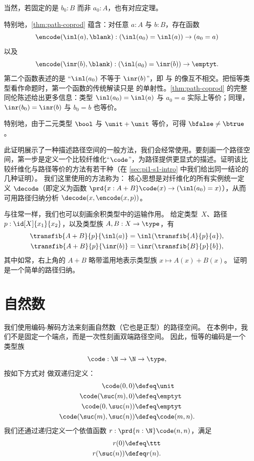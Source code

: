 \noindent
当然，若固定的是 $b_0:B$ 而非 $a_0:A$，也有对应定理。

特别地，\cref{thm:path-coprod} 蕴含：对任意 $a : A$ 与 $b : B$，存在函数
%
\[ \encode(\inl(a), {\blank}) : (\inl(a_0)=\inl(a)) \to (a_0=a)\]
%
以及
%
\[ \encode(\inr(b), {\blank}) : (\inl(a_0)=\inr(b)) \to \emptyt. \]
%
第二个函数表述的是
“$\inl(a_0)$ 不等于 $\inr(b)$”，即 \inl 与 \inr 的像互不相交。把恒等类型看作命题时，第一个函数的传统解读只是 \inl 的单射性。\cref{thm:path-coprod} 的完整同伦陈述给出更多信息：类型 $\inl(a_0)=\inl(a)$ 与
$a_0=a$ 实际上等价；同理，$\inr(b_0)=\inr(b)$ 与 $b_0=b$ 也等价。

\begin{rmk}\label{rmk:true-neq-false}
特别地，由于二元类型 $\bool$ 与 $\unit+\unit$ 等价，可得 $\bfalse\neq\btrue$。
\end{rmk}

此证明展示了一种描述路径空间的一般方法，我们会经常使用。要刻画一个路径空间，第一步是定义一个比较纤维化“$\code$”，为路径提供更显式的描述。证明该比较纤维化与路径等价的方法有若干种（在 \cref{sec:pi1-s1-intro} 中我们给出同一结论的几种证明）。
我们这里使用的方法称为：
核心思想是对纤维化的所有实例统一定义 $\decode$（即定义为函数 $\prd{x:A+B} \code(x) \to (\inl(a_0)=x)$），从而可用路径归纳分析 $\decode(x,\encode(x,p))$。

%
与往常一样，我们也可以刻画余积类型中的运输作用。
给定类型~$X$、路径 $p:\id[X]{x_1}{x_2}$，以及类型族 $A,B:X\to\type$，有
\begin{align*}
  \transfib{A+B}{p}{\inl(a)} &= \inl (\transfib{A}{p}{a}),\\
  \transfib{A+B}{p}{\inr(b)} &= \inr (\transfib{B}{p}{b}),
\end{align*}
其中如常，右上角的 $A+B$ 略带滥用地表示类型族 $x\mapsto A(x)+B(x)$。
证明是一个简单的路径归纳。

%
%
\section{自然数}
\label{sec:compute-nat}

%
%
我们使用编码-解码方法来刻画自然数（它也是正型）的路径空间。
在本例中，我们不是固定一个端点，而是一次性刻画双端路径空间。
因此，恒等的编码是一个类型族
\[\code:\N\to\N\to\type,\]
按如下方式对 \N 做双递归定义：
\begin{align*}
  \code(0,0) &\defeq \unit\\
  \code(\suc(m),0) &\defeq \emptyt\\
  \code(0,\suc(n)) &\defeq \emptyt\\
  \code(\suc(m),\suc(n)) &\defeq \code(m,n).
\end{align*}
我们还通过递归定义一个依值函数 $r:\prd{n:\N} \code(n,n)$，满足
\begin{align*}
  r(0) &\defeq \ttt\\
  r(\suc(n)) &\defeq r(n).
\end{align*}

